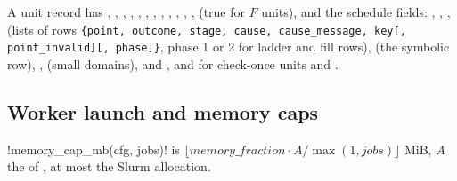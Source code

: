 A unit record has , , , , ,
, , , , , ,
,  (true for $F$ units), and the schedule fields:
, , ,  (lists of rows
\texttt{\{point, outcome, stage, cause, cause\_message, key[, point\_invalid][, phase]\}}, phase 1
or 2 for ladder and fill rows),  (the symbolic row), ,
 (small domains),  and , and for check-once
units  and .

\subsection{Worker launch and memory caps}\label{sec:bench-launch}

\py!memory_cap_mb(cfg, jobs)! is $\lfloor \mathit{memory\_fraction}\cdot A / \max(1,
\mathit{jobs})\rfloor$ MiB, $A$ the  of , at most the Slurm
allocation.

